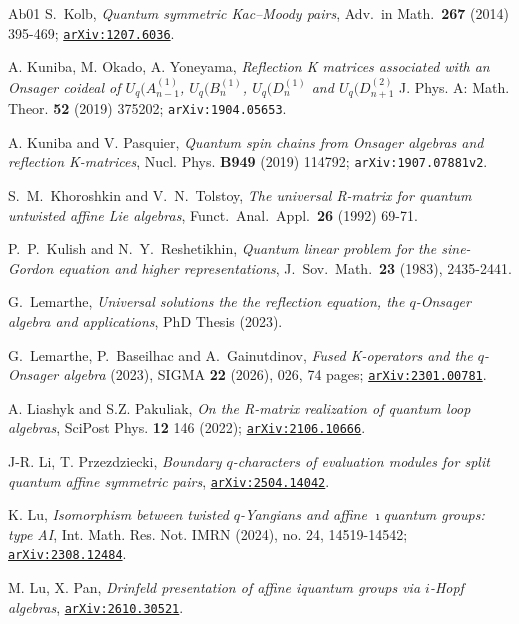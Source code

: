\documentclass[11pt]{amsart}
\numberwithin{equation}{section}
\numberwithin{equation}{section}
\begin{document}
\begin{thebibliography}{Ab01}
S.\ Kolb, \textit{Quantum symmetric Kac–Moody pairs}, Adv.\ in Math.\ {\bf 267} (2014) 395-469; \href{https://arxiv.org/abs/1207.6036}{\tt arXiv:1207.6036}.

A. Kuniba, M. Okado, A. Yoneyama, 
{\it Reflection K matrices associated with an Onsager coideal of $U_q(A_{n-1}^{(1)}$,  $U_q(B_{n}^{(1)}$,  $U_q(D_{n}^{(1)}$ and  $U_q(D_{n+1}^{(2)}$}
J. Phys. A: Math. Theor. {\bf 52} (2019) 375202;
{\tt arXiv:1904.05653}.

A. Kuniba and V. Pasquier, {\it Quantum spin chains from Onsager algebras and reflection K-matrices}, Nucl. Phys. {\bf B949} (2019) 114792; {\tt arXiv:1907.07881v2}.

S.\ M.\ Khoroshkin and V.\ N.\ Tolstoy, \textit{The universal R-matrix for quantum untwisted affine Lie algebras}, Funct.\ Anal.\ Appl.\ {\bf 26} (1992) 69-71.

			P.\ P.\ Kulish and N.\ Y.\  Reshetikhin, \textit{Quantum linear problem for the sine-Gordon equation and higher representations}, J.\ Sov.\ Math.\ {\bf 23} (1983), 2435-2441.

G.\ Lemarthe, {\it Universal solutions the the reflection equation, the $q$-Onsager algebra and applications}, PhD Thesis (2023).

 G.\ Lemarthe, P.\ Baseilhac and A.\ Gainutdinov,	{\it Fused K-operators and the $q$-Onsager algebra} (2023), SIGMA {\bf 22} (2026), 026, 74 pages; \href{https://arxiv.org/abs/2301.00781}{\tt arXiv:2301.00781}.



A. Liashyk and S.Z. Pakuliak, {\it On the R-matrix realization of quantum loop algebras}, SciPost Phys. {\bf 12} 146 (2022); \href{https://arxiv.org/abs/2106.10666}{\tt arXiv:2106.10666}.

J-R. Li, T. Przezdziecki, {\it Boundary  $q$-characters of evaluation modules for split quantum affine symmetric pairs}, \href{https://arxiv.org/abs/2504.14042}{\tt arXiv:2504.14042}.


K. Lu, {\it Isomorphism between twisted $q$-Yangians and affine $\imath$quantum groups: type AI},  	Int. Math. Res. Not. IMRN (2024), no. 24, 14519-14542; \href{https://arxiv.org/abs/2308.12484}{\tt arXiv:2308.12484}.

M. Lu, X. Pan, {\it Drinfeld presentation of affine iquantum groups via $i$-Hopf algebras}, \href{https://arxiv.org/abs/2610.30521}{\tt arXiv:2610.30521}.


\end{thebibliography}
\end{document}
